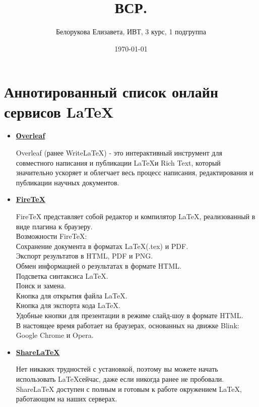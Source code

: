 \documentclass[a4paper,12pt]{article} %
\author{Белорукова Елизавета, ИВТ, 3 курс, 1 подгруппа}
\title{ВСР.}
\date{\today}
\begin{document}
\maketitle
\newpage

\section{Аннотированный список онлайн сервисов \LaTeX}




\begin{itemize}

\item \large \textbf{\href{https://www.overleaf.com/}{Оverleaf}}

\normalsize Overleaf (ранее WriteLaTeX) - это интерактивный инструмент для совместного написания и публикации \LaTeX и Rich Text, который значительно ускоряет и облегчает весь процесс написания, редактирования и публикации научных документов.

\item \large \textbf{\href{https://sourceforge.net/projects/firetex/}{FireTeX}}

\normalsize FireTeX представляет собой редактор и компилятор LaTeX, реализованный в виде плагина к браузеру.\\
Возможности FireTeX:\\
Сохранение документа в форматах \LaTeX (.tex) и PDF.\\
Экспорт результатов в HTML, PDF и PNG.\\
Обмен информацией о результатах в формате HTML.\\
Подсветка синтаксиса \LaTeX.\\
Поиск и замена.\\
Кнопка для открытия файла \LaTeX.\\
Кнопка для экспорта кода \LaTeX.\\
Удобные кнопки для презентации в режиме слайд-шоу в формате HTML.\\
В настоящее время работает на браузерах, основанных на движке Blink: Google Chrome и Opera.\\


\item \large \textbf{\href{https://ru.sharelatex.com/}{ShareLaTeX}}

\normalsize Нет никаких трудностей с установкой, поэтому вы можете начать использовать \LaTeX сейчас, даже если никогда ранее не пробовали. ShareLaTeX доступен с полным и готовым к работе окружением \LaTeX, работающим на наших серверах.


\end{itemize}
\end{document}

